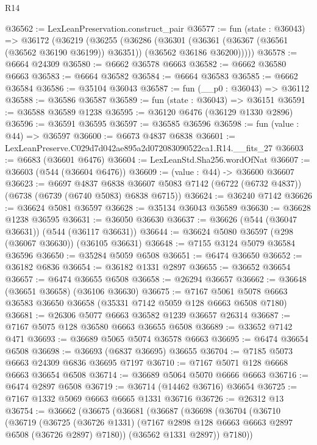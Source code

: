 \begin{lexlean}{R14}
\begin{coremodule}
@36562 := LexLeanPreservation.construct_pair
@36577 := fun (state : @36043) =>
  @36172
    (@36219
      (@36255
        (@36286
          (@36301
            (@36361 (@36367 (@36561 (@36562 @36190 @36199)) @36351))
            (@36562 @36186 @36200)))))
@36578 := @6664 @24309
@36580 := @6662 @36578 @6663
@36582 := @6662 @36580 @6663
@36583 := @6664 @36582
@36584 := @6664 @36583
@36585 := @6662 @36584
@36586 := @35104 @36043
@36587 := fun (__p0 : @36043) => @36112
@36588 := @36586 @36587
@36589 := fun (state : @36043) => @36151
@36591 := @36588 @36589 @1238
@36595 := @36120 @6476 (@36129 @1330 @2896)
@36596 := @36591 @36595
@36597 := @36585 @36596
@36598 := fun (value : @44) => @36597
@36600 := @6673 @4837 @6838
@36601 := LexLeanPreserve.C029d7d042ae895a2d072083090522ca1.R14.__fits_27
@36603 := @6683 (@36601 @6476)
@36604 := LexLeanStd.Sha256.wordOfNat
@36607 := @36603 (@544 (@36604 @6476))
@36609 := (value : @44) -> @36600 @36607
@36623 := @6697
    @4837
    @6838
    @36607
    @5083
    @7142
    (@6722 (@6732 @4837))
    (@6738 (@6739 (@6740 @5083) @6838 @6715))
@36624 := @36240 @7142
@36626 := @36624 @5081 @36597
@36628 := @35134 @36043 @36589
@36630 := @36628 @1238 @36595
@36631 := @36050 @36630
@36637 := @36626 (@544 (@36047 @36631)) (@544 (@36117 @36631))
@36644 := @36624 @5080 @36597 (@298 (@36067 @36630)) (@36105 @36631)
@36648 := @7155 @3124 @5079 @36584 @36596
@36650 := @35284 @5059 @6508
@36651 := @6474 @36650
@36652 := @36182 @6836
@36654 := @36182 @1331 @2897
@36655 := @36652 @36654
@36657 := @6474 @36655 @6508
@36658 := @26294 @36657
@36662 := @36648 (@36651 @36658) (@36106 @36630)
@36675 := @7167 @5061 @5078 @6663 @36583 @36650 @36658 (@35331 @7142 @5059 @128 @6663 @6508 @7180)
@36681 := @26306 @5077 @6663 @36582 @1239 @36657 @26314
@36687 := @7167 @5075 @128 @36580 @6663 @36655 @6508
@36689 := @33652 @7142 @471
@36693 := @36689 @5065 @5074 @36578 @6663
@36695 := @6474 @36654 @6508
@36698 := @36693 (@6837 @36695) @36655
@36704 := @7185 @5073 @6663 @24309 @6836 @36695 @7197
@36710 := @7167 @5071 @128 @6668 @6663 @36654 @6508
@36714 := @36689 @5064 @5070 @6666 @6663
@36716 := @6474 @2897 @6508
@36719 := @36714 (@14462 @36716) @36654
@36725 := @7167 @1332 @5069 @6663 @6665 @1331 @36716
@36726 := @26312 @13
@36754 := @36662
    (@36675
      (@36681
        (@36687
          (@36698
            (@36704
              (@36710
                (@36719
                  (@36725
                    (@36726 @1331)
                    (@7167 @2898 @128 @6663 @6663 @2897 @6508 (@36726 @2897) @7180))
                  (@36562 @1331 @2897))
                @7180))

\end{coremodule}
\end{lexlean}
